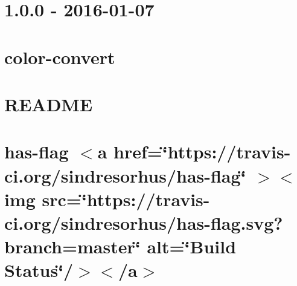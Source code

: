 \documentclass[twoside]{book}
\newcommand{\+}{\discretionary{\mbox{\scriptsize$\hookleftarrow$}}{}{}}
\begin{document}
\chapter{1.0.0 -\/ 2016-\/01-\/07}
\label{md__c___users_vaishnavi_jadhav__desktop__developer_code_mean_stack_example_client_node_modules_lbaa6e95c3545181a0f9f0a9f937d36a0}

\chapter{color-\/convert}
\label{md__c___users_vaishnavi_jadhav__desktop__developer_code_mean_stack_example_client_node_modules_l6938cfa2ee8af5dea2038c2c9f3b218e}

\chapter{README}
\label{md__c___users_vaishnavi_jadhav__desktop__developer_code_mean_stack_example_client_node_modules_l8df0d79ab327a55a90a8e260e23cd3e5}

\chapter{has-\/flag \texorpdfstring{$<$}{<}a href=\char`\"{}https\+://travis-\/ci.\+org/sindresorhus/has-\/flag\char`\"{} \texorpdfstring{$>$}{>}\texorpdfstring{$<$}{<}img src=\char`\"{}https\+://travis-\/ci.\+org/sindresorhus/has-\/flag.\+svg?branch=master\char`\"{} alt=\char`\"{}\+Build Status\char`\"{}/\texorpdfstring{$>$}{>}\texorpdfstring{$<$}{<}/a\texorpdfstring{$>$}{>}}
\label{md__c___users_vaishnavi_jadhav__desktop__developer_code_mean_stack_example_client_node_modules_l6aee42bb9c6090f82b23d7d3a9b79a09}

\end{document}
